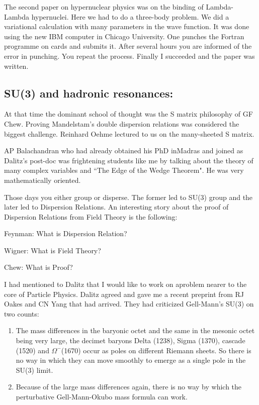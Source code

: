 The second paper on hypernuclear physics was on the binding of 
Lambda-Lambda hypernuclei. Here we had to do a three-body problem. We 
did a variational calculation with many parameters in the wave function. 
It was done using the new IBM computer in Chicago University. One 
punches the Fortran programme on cards and submits it. After several 
hours you are informed of the error in punching. You repeat the process. 
Finally I succeeded and the paper was written.

\vspace{-\topsep}
\subsection*{SU(3) and hadronic resonances:}

At that time the dominant school of thought was the S matrix philosophy 
of GF Chew. Proving Mandelstam's double dispersion relations was 
considered the biggest challenge. Reinhard Oehme lectured to us on the 
many-sheeted S matrix.

AP Balachandran who had already obtained his PhD in\break Madras and joined as 
Dalitz's post-doc was frightening students like me by talking about the 
theory of many complex variables and ``The Edge of the Wedge Theorem". He 
was very mathematically oriented.

Those days you either group or disperse. The former led to SU(3) group 
and the later led to Dispersion Relations. An intere\-sting story about 
the proof of Dispersion Relations from Field Theory is the following:

Feynman: What is Dispersion Relation?

Wigner: What is Field Theory?

Chew: What is Proof?

I had mentioned to Dalitz that I would like to work on a\break problem nearer 
to the core of Particle Physics. Dalitz agreed and gave me a recent 
preprint from RJ Oakes and CN Yang that had arrived. They had criticized 
Gell-Mann's SU(3) on two counts:

\begin{enumerate}
\itemsep=0pt
\item The mass differences in the baryonic octet and the same in the mesonic 
octet being very large, the decimet baryons Delta (1238), Sigma (1370), 
cascade (1520) and $\Omega^-$(1670) occur as poles on different Riemann 
sheets. So there is no way in which they can move smoothly to emerge as 
a single pole in the SU(3) limit.
\item Because of the large mass differences again, there is no way by which 
the perturbative Gell-Mann-Okubo mass formula can work.
\end{enumerate}

